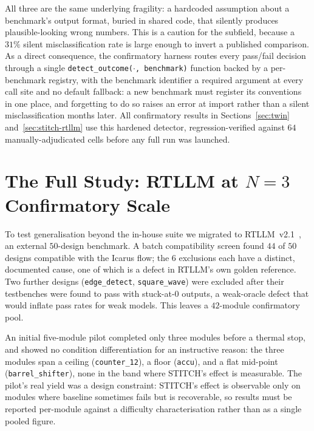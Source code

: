 \documentclass[11pt]{article}
\begin{document}
All three are the same underlying fragility: a hardcoded assumption about a
benchmark's output format, buried in shared code, that silently produces
plausible-looking wrong numbers. This is a caution for the subfield, because a
$31\%$ silent misclassification rate is large enough to invert a published
comparison. As a direct consequence, the confirmatory harness routes every
pass/fail decision through a single \texttt{detect\_outcome($\cdot$,
benchmark)} function backed by a per-benchmark registry, with the benchmark
identifier a required argument at every call site and no default fallback: a
new benchmark must register its conventions in one place, and forgetting to do
so raises an error at import rather than a silent misclassification months
later. All confirmatory results in Sections~\ref{sec:twin}
and~\ref{sec:stitch-rtllm} use this hardened detector, regression-verified
against $64$ manually-adjudicated cells before any full run was launched.

\section{The Full Study: RTLLM at $N{=}3$ Confirmatory Scale}
\label{sec:fullstudy}

To test generalisation beyond the in-house suite we migrated to
RTLLM~v2.1~\cite{lu2024rtllm}, an external $50$-design benchmark. A batch
compatibility screen found $44$ of $50$ designs compatible with the Icarus
flow; the $6$ exclusions each have a distinct, documented cause, one of which
is a defect in RTLLM's own golden reference. Two further designs
(\texttt{edge\_detect}, \texttt{square\_wave}) were excluded after their
testbenches were found to pass with stuck-at-$0$ outputs, a weak-oracle defect
that would inflate pass rates for weak models. This leaves a $42$-module
confirmatory pool.

An initial five-module pilot completed only three modules before a thermal
stop, and showed no condition differentiation for an instructive reason: the
three modules span a ceiling (\texttt{counter\_12}), a floor (\texttt{accu}),
and a flat mid-point (\texttt{barrel\_shifter}), none in the band where
STITCH's effect is measurable. The pilot's real yield was a design constraint:
STITCH's effect is observable only on modules where baseline sometimes fails
but is recoverable, so results must be reported per-module against a
difficulty characterisation rather than as a single pooled figure.
\end{document}
